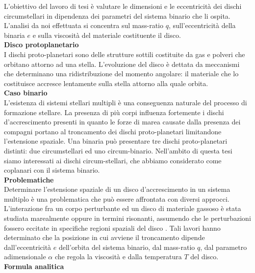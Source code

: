 \documentclass[12pt, a4paper]{report}
\begin{document}
L'obiettivo del lavoro di tesi è valutare le dimensioni e le eccentricità dei dischi circumstellari in dipendenza dei parametri del sistema binario che li ospita.
L'analisi da noi effettuata si concentra sul mass-ratio $q$, sull'eccentricità della binaria $e$ e sulla viscosità del materiale costituente il disco.\\

\textbf{Disco protoplanetario}\\

I dischi proto-planetari sono delle strutture sottili costituite da gas e polveri che orbitano attorno ad una stella.
L'evoluzione del disco è dettata da meccanismi che determinano una ridistribuzione del momento angolare: il materiale che lo costituisce accresce lentamente sulla stella attorno alla quale orbita.\\

\textbf{Caso binario}\\

L'esistenza di sistemi stellari multipli è una conseguenza naturale del processo di formazione stellare.
La presenza di più corpi influenza fortemente i dischi d'accrescimento presenti in quanto le forze di marea causate dalla presenza dei compagni portano al troncamento dei dischi proto-planetari limitandone l'estensione spaziale.
Una binaria può presentare tre dischi proto-planetari distinti: due circumstellari ed uno circum-binario.
Nell'ambito di questa tesi siamo interessati ai dischi circum-stellari, che abbiamo considerato come coplanari con il sistema binario.\\

\textbf{Problematiche}\\

Determinare l'estensione spaziale di un disco d'accrescimento in un sistema multiplo è una problematica che può essere affrontata con diversi approcci.
L'interazione fra un corpo perturbante ed un disco di materiale gassoso è stata studiata marealmente \parencite{PapaloizouPringle1977} oppure in termini risonanti, assumendo che le perturbazioni fossero eccitate in specifiche regioni spaziali del disco \parencite{GoldreichTremaine1980}.
Tali lavori hanno determinato che la posizione in cui avviene il troncamento dipende dall'eccentricità $e$ dell'orbita del sistema binario, dal mass-ratio $q$, dal parametro adimensionale $\alpha$ che regola la viscosità e dalla temperatura $T$ del disco. \\

\textbf{Formula analitica}\\
\end{document}

